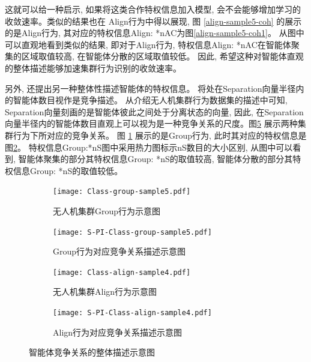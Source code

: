 这就可以给一种启示, 如果将这类合作特权信息加入模型, 会不会能够增加学习的收敛速率。类似的结果也在 Align行为中得以展现, 图 \ref{align-sample5-coh} 的展示的是Align行为, 其对应的特权信息{Align: *nAC}为图\ref{align-sample5-coh1}。 从图中可以直观地看到类似的结果, 即对于Align行为, 特权信息{Align: *nAC}在智能体聚集的区域取值较高, 在智能体分散的区域取值较低。 因此, 希望这种对智能体直观的整体描述能够加速集群行为识别的收敛速率。

另外, 还提出另一种整体性描述智能体的特权信息。 将处在Separation向量半径内的智能体数目视作是竞争描述。 从介绍无人机集群行为数据集的描述中可知, Separation向量刻画的是智能体彼此之间处于分离状态的向量, 因此, 在Separation向量半径内的智能体数目直观上可以视为是一种竞争关系的尺度。图\ref{fig:nS-demon} 展示两种集群行为下所对应的竞争关系。 图 \ref{group-sample5-jz} 展示的是Group行为, 此时其对应的特权信息是图\ref{group-sample5-jz1}。 特权信息{Group:*nS}图中采用热力图标示{nS}数目的大小区别, 从图中可以看到, 智能体聚集的部分其特权信息{Group: *nS}的取值较高, 智能体分散的部分其特权信息{Group: *nS}的取值较低。 

%

\begin{figure}
     \centering
     \begin{subfigure}[b]{.45\textwidth}
         \centering
         \texttt{[image: Class-group-sample5.pdf]}   
         \caption{无人机集群Group行为示意图}
         \label{group-sample5-jz}
     \end{subfigure}
     \hfill
     \begin{subfigure}[b]{.45\textwidth}
         \centering
         \texttt{[image: S-PI-Class-group-sample5.pdf]}
         \caption{Group行为对应竞争关系描述示意图}
         \label{group-sample5-jz1}
     \end{subfigure}
     \hfill
     \begin{subfigure}[b]{.45\textwidth}
         \centering
         \texttt{[image: Class-align-sample4.pdf]}
         \caption{无人机集群Align行为示意图}
         \label{align-sample5-jz}
     \end{subfigure}
     \hfill
     \begin{subfigure}[b]{.45\textwidth}
         \centering
         \texttt{[image: S-PI-Class-align-sample4.pdf]}
         \caption{Align行为对应竞争关系描述示意图}
         \label{align-sample5-jz1}
     \end{subfigure}          
\caption{智能体竞争关系的整体描述示意图}
\label{fig:nS-demon}
\end{figure}

